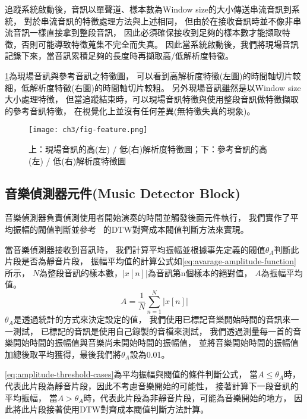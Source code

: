 \documentclass[class=NCU_thesis, crop=false]{standalone}
\begin{document}
追蹤系統啟動後，音訊以單聲道、樣本數為Window size的大小傳送串流音訊到系統，
對於串流音訊的特徵處理方法與上述相同，
但由於在接收音訊時並不像非串流音訊一樣直接拿到整段音訊，
因此必須確保接收到足夠的樣本數才能擷取特徵，否則可能導致特徵蒐集不完全而失真。
因此當系統啟動後，我們將現場音訊記錄下來，當音訊累積足夠的長度時再擷取高/低解析度特徵。

\cref{fig:fig-ch3-feature}為現場音訊與參考音訊之特徵圖，
可以看到高解析度特徵(左圖)的時間軸切片較細，低解析度特徵(右圖)的時間軸切片較粗。
另外現場音訊雖然是以Window size大小處理特徵，
但當追蹤結束時，可以現場音訊特徵與使用整段音訊做特徵擷取的參考音訊特徵，
在視覺化上並沒有任何差異(無特徵失真的現象)。

\begin{figure}[H]
    \centering
    \texttt{[image: ch3/fig-feature.png]}
    \caption{上：現場音訊的高(左) / 低(右)解析度特徵圖；下：參考音訊的高(左) / 低(右)解析度特徵圖}
    \label{fig:fig-ch3-feature}
\end{figure}

\subsection{音樂偵測器元件(Music Detector Block)} \label{ch3-subst-music-detector}
音樂偵測器負責偵測使用者開始演奏的時間並觸發後面元件執行，
我們實作了平均振幅的閥值判斷並參考~\cite{Lin2020AHumanComputerDuetSystem}
的DTW對齊成本閥值判斷方法來實現。

當音樂偵測器接收到音訊時，
我們計算平均振幅並根據事先定義的閥值$\theta _{A}$判斷此片段是否為靜音片段，
振幅平均值的計算公式如\cref{eq:avarage-amplitude-function}所示，
$N$為整段音訊的樣本數，$| x[n] \vert$為音訊第n個樣本的絕對值，
$A$為振幅平均值。
\begin{equation}
    \label{eq:avarage-amplitude-function}
    A = \frac{1}{N} \sum _{n=1}^{N} | x[n] \vert 
\end{equation}
$\theta _{A}$是透過統計的方式來決定設定的值，
我們使用已標記音樂開始時間的音訊來一一測試，
已標記的音訊是使用自己錄製的音檔來測試，
我們透過測量每一首的音樂開始時間的振幅值與音樂尚未開始時間的振幅值，
並將音樂開始時間的振幅值加總後取平均獲得，最後我們將$\theta _{A}$設為0.01。

\cref{eq:amplitude-threshold-cases}為平均振幅與閥值的條件判斷公式，
當$A \leq \theta _{A}$時，代表此片段為靜音片段，因此不考慮音樂開始的可能性，
接著計算下一段音訊的平均振幅，
當$A > \theta _{A}$時，代表此片段為非靜音片段，可能為音樂開始的地方，
因此將此片段接著使用DTW對齊成本閥值判斷方法計算。
\end{document}
